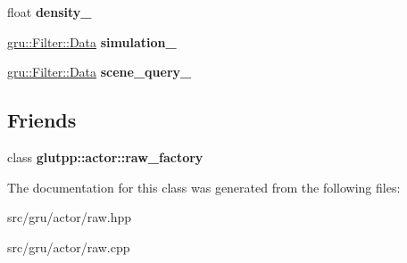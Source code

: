 \begin{DoxyCompactItemize}
\item 
\hypertarget{classglutpp_1_1actor_1_1raw_a0285b6aeb5461103769b0f3f4ef0247a}{float {\bfseries density\-\_\-}}\label{classglutpp_1_1actor_1_1raw_a0285b6aeb5461103769b0f3f4ef0247a}

\item 
\hypertarget{classglutpp_1_1actor_1_1raw_a6986044c1c5542480bf16184f38d604c}{\hyperlink{classgru_1_1Filter_1_1Data}{gru\-::\-Filter\-::\-Data} {\bfseries simulation\-\_\-}}\label{classglutpp_1_1actor_1_1raw_a6986044c1c5542480bf16184f38d604c}

\item 
\hypertarget{classglutpp_1_1actor_1_1raw_ace9b6b28a7c3611944d6465bc2eb5e3e}{\hyperlink{classgru_1_1Filter_1_1Data}{gru\-::\-Filter\-::\-Data} {\bfseries scene\-\_\-query\-\_\-}}\label{classglutpp_1_1actor_1_1raw_ace9b6b28a7c3611944d6465bc2eb5e3e}

\end{DoxyCompactItemize}
\subsection*{\-Friends}
\begin{DoxyCompactItemize}
\item 
\hypertarget{classglutpp_1_1actor_1_1raw_a8c5b9dbf4aee2e1f4ec6c18451376357}{class {\bfseries glutpp\-::actor\-::raw\-\_\-factory}}\label{classglutpp_1_1actor_1_1raw_a8c5b9dbf4aee2e1f4ec6c18451376357}

\end{DoxyCompactItemize}


\-The documentation for this class was generated from the following files\-:\begin{DoxyCompactItemize}
\item 
src/gru/actor/raw.\-hpp\item 
src/gru/actor/raw.\-cpp\end{DoxyCompactItemize}
